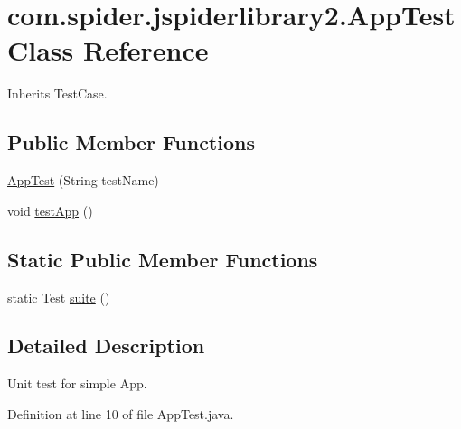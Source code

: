 \hypertarget{classcom_1_1spider_1_1jspiderlibrary2_1_1_app_test}{\section{com.\-spider.\-jspiderlibrary2.\-App\-Test \-Class \-Reference}
\label{classcom_1_1spider_1_1jspiderlibrary2_1_1_app_test}
}


\-Inherits \-Test\-Case.

\subsection*{\-Public \-Member \-Functions}
\begin{DoxyCompactItemize}
\item 
\hyperlink{classcom_1_1spider_1_1jspiderlibrary2_1_1_app_test_aa56fd22977acd91288f5c25d8ed0f7b8}{\-App\-Test} (\-String test\-Name)
\item 
void \hyperlink{classcom_1_1spider_1_1jspiderlibrary2_1_1_app_test_aa82f908d85995afeb07783aa15f140ff}{test\-App} ()
\end{DoxyCompactItemize}
\subsection*{\-Static \-Public \-Member \-Functions}
\begin{DoxyCompactItemize}
\item 
static \-Test \hyperlink{classcom_1_1spider_1_1jspiderlibrary2_1_1_app_test_a01463266095328ece727b5f07a92b4fe}{suite} ()
\end{DoxyCompactItemize}


\subsection{\-Detailed \-Description}
\-Unit test for simple \-App. 

\-Definition at line 10 of file \-App\-Test.\-java.



